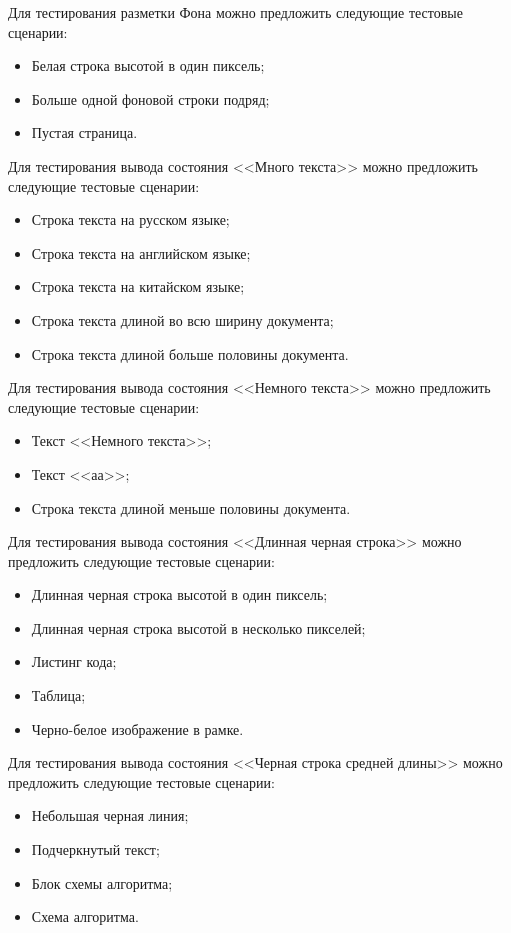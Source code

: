 Для тестирования разметки Фона можно предложить следующие тестовые сценарии:
\begin{itemize}
    \item Белая строка высотой в один пиксель;
    \item Больше одной фоновой строки подряд;
    \item Пустая страница.
\end{itemize}

Для тестирования вывода состояния <<Много текста>> можно предложить следующие тестовые сценарии:
\begin{itemize}
    \item Строка текста на русском языке;
    \item Строка текста на английском языке;
    \item Строка текста на китайском языке;
    \item Строка текста длиной во всю ширину документа;
    \item Строка текста длиной больше половины документа.
\end{itemize}

Для тестирования вывода состояния <<Немного текста>> можно предложить следующие тестовые сценарии:
\begin{itemize}
    \item Текст <<Немного текста>>;
    \item Текст <<аа>>;
    \item Строка текста длиной меньше половины документа.
\end{itemize}

Для тестирования вывода состояния <<Длинная черная строка>> можно предложить следующие тестовые сценарии:
\begin{itemize}
    \item Длинная черная строка высотой в один пиксель;
    \item Длинная черная строка высотой в несколько пикселей;
    \item Листинг кода;
    \item Таблица;
    \item Черно-белое изображение в рамке.
\end{itemize}

Для тестирования вывода состояния <<Черная строка средней длины>> можно предложить следующие тестовые сценарии:
\begin{itemize}
    \item Небольшая черная линия;
    \item Подчеркнутый текст;
    \item Блок схемы алгоритма;
    \item Схема алгоритма.
\end{itemize}

